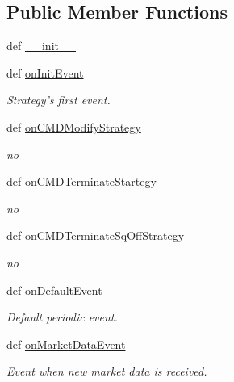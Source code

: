 \subsection*{Public Member Functions}
\begin{DoxyCompactItemize}
\item 
def \hyperlink{classmuTradePyBase_1_1CustomStrategy_ac6fcdf08165af5413c9883bf68dcd23b}{\_\-\_\-init\_\-\_\-}
\item 
def \hyperlink{classmuTradePyBase_1_1CustomStrategy_a8accc7202088d5163a9bffa940961713}{onInitEvent}
\begin{DoxyCompactList}\small\item\em Strategy's first event. \item\end{DoxyCompactList}\item 
def \hyperlink{classmuTradePyBase_1_1CustomStrategy_af8fb22d6864e7c61a61f94cf963746e5}{onCMDModifyStrategy}
\begin{DoxyCompactList}\small\item\em no \item\end{DoxyCompactList}\item 
def \hyperlink{classmuTradePyBase_1_1CustomStrategy_aeb2e0e2196645380512c59f9752efb5e}{onCMDTerminateStartegy}
\begin{DoxyCompactList}\small\item\em no \item\end{DoxyCompactList}\item 
def \hyperlink{classmuTradePyBase_1_1CustomStrategy_a8b35516aaa2a7f1940ad86191e022b8e}{onCMDTerminateSqOffStrategy}
\begin{DoxyCompactList}\small\item\em no \item\end{DoxyCompactList}\item 
def \hyperlink{classmuTradePyBase_1_1CustomStrategy_a30611f9dbe54a60219fcb95605004eaa}{onDefaultEvent}
\begin{DoxyCompactList}\small\item\em Default periodic event. \item\end{DoxyCompactList}\item 
def \hyperlink{classmuTradePyBase_1_1CustomStrategy_aea61c58829beb5f5e4bfa3355da9a23b}{onMarketDataEvent}
\begin{DoxyCompactList}\small\item\em Event when new market data is received. \item\end{DoxyCompactList}\item 

\end{DoxyCompactItemize}
